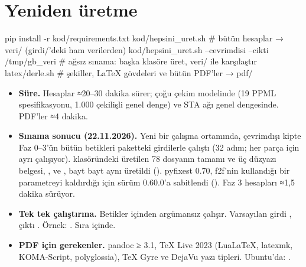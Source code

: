 \endgroup

\hypertarget{README-yeniden-uxfcretme}{%
\section{Yeniden üretme}\label{README-yeniden-uxfcretme}}

\begin{gbkod}
pip install -r kod/requirements.txt
kod/hepsini_uret.sh                                     # bütün hesaplar → veri/ (girdi/'deki ham verilerden)
kod/hepsini_uret.sh --cevrimdisi --cikti /tmp/gb_veri   # ağsız sınama: başka klasöre üret, veri/ ile karşılaştır
latex/derle.sh                                          # şekiller, LaTeX gövdeleri ve bütün PDF'ler → pdf/
\end{gbkod}

\begin{itemize}
\tightlist
\item
  \textbf{Süre.} Hesaplar ≈20--30 dakika sürer; çoğu çekim modelinde (19 PPML spesifikasyonu, 1.000 çekilişli genel denge) ve STA ağı genel dengesinde. PDF'ler ≈4 dakika.
\item
  \textbf{Sınama sonucu (22.11.2026).} Yeni bir çalışma ortamında, çevrimdışı kipte Faz 0--3'ün bütün betikleri paketteki girdilerle çalıştı (32 adım;  her parça için ayrı çalışıyor).  klasöründeki üretilen 78 dosyanın tamamı ve üç düzyazı belgesi, ,  ve , bayt bayt aynı üretildi (). pyfixest 0.70, f2f'nin kullandığı bir parametreyi kaldırdığı için sürüm 0.60.0'a sabitlendi (). Faz 3 hesapları ≈1,5 dakika sürüyor.
\item
  \textbf{Tek tek çalıştırma.} Betikler  içinden argümansız çalışır. Varsayılan girdi , çıktı . Örnek: . Sıra  içinde.
\item
  \textbf{PDF için gerekenler.} pandoc ≥ 3.1, TeX Live 2023 (LuaLaTeX, latexmk, KOMA-Script, polyglossia), TeX Gyre ve DejaVu yazı tipleri. Ubuntu'da: .
\end{itemize}

